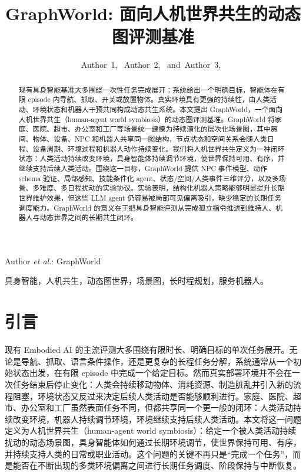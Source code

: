 \documentclass[journal]{IEEEtran}
\begin{document}
\title{GraphWorld: 面向人机世界共生的动态图评测基准}

\author{Author~1,~
        Author~2,~
        and~Author~3,~%
}

%
{Author \MakeLowercase{\textit{et al.}}: GraphWorld}

\maketitle

\begin{abstract}
现有具身智能基准大多围绕一次性任务完成展开：系统给出一个明确目标，智能体在有限 episode 内导航、抓取、开关或放置物体。真实环境具有更强的持续性，由人类活动、环境状态和机器人干预共同构成动态共生系统。本文提出 GraphWorld，一个面向人机世界共生（human-agent world symbiosis）的动态图评测基准。GraphWorld 将家庭、医院、超市、办公室和工厂等场景统一建模为持续演化的层次化场景图，其中房间、物体、设备、NPC 和机器人共享同一图结构，节点状态和空间关系会随人类日程、设备周期、环境过程和机器人动作持续变化。我们将人机世界共生定义为一种闭环状态：人类活动持续改变环境，具身智能体持续调节环境，使世界保持可用、有序，并继续支持后续人类活动。围绕这一目标，GraphWorld 提供 NPC 事件模型、动作 schema 验证、局部感知、技能条件化 agent、状态/空间/人类事件三维评分，以及多场景、多难度、多日程扰动的实验协议。实验表明，结构化机器人策略能够明显提升长期世界维护效果，但这些 LLM agent 仍容易被局部可见偏离吸引，缺少稳定的长期任务调度能力。GraphWorld 的意义在于把具身智能评测从完成孤立指令推进到维持人、机器人与动态世界之间的长期共生闭环。
\end{abstract}

\begin{IEEEkeywords}
具身智能，人机共生，动态图世界，场景图，长时程规划，服务机器人。
\end{IEEEkeywords}

\section{引言}
现有 Embodied AI 的主流评测大多围绕有限时长、明确目标的单次任务展开。无论是导航、抓取、语言条件操作，还是更复杂的长程任务分解，系统通常从一个初始状态出发，在有限 episode 中完成一个给定目标。然而真实部署环境并不会在一次任务结束后停止变化：人类会持续移动物体、消耗资源、制造脏乱并引入新的流程阻塞，环境状态又反过来决定后续人类活动是否能够顺利进行。家庭、医院、超市、办公室和工厂虽然表面任务不同，但都共享同一个更一般的闭环：人类活动持续改变环境，机器人持续调节环境，环境继续支持后续人类活动。本文将这一问题定义为人机世界共生（human-agent world symbiosis）：给定一个被人类活动持续扰动的动态场景图，具身智能体如何通过长期环境调节，使世界保持可用、有序，并持续支持人类的日常或职业活动。这个问题的关键不再只是“完成一个任务”，而是能否在不断出现的多类环境偏离之间进行长期任务调度、阶段保持与中断恢复。
\end{document}

